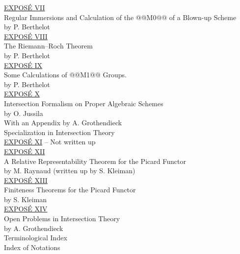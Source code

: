 \underline{EXPOSÉ VII}\\
Regular Immersions and Calculation of the @@M0@@ of a Blown-up Scheme\\
by P. Berthelot \\[8pt]
\underline{EXPOSÉ VIII}\\
The Riemann--Roch Theorem\\
by P. Berthelot \\[8pt]
\underline{EXPOSÉ IX}\\
Some Calculations of @@M1@@ Groups.\\
by P. Berthelot \\[8pt]
\underline{EXPOSÉ X}\\
Intersection Formalism on Proper Algebraic Schemes\\
by O. Jussila\\
With an Appendix by A. Grothendieck\\
Specialization in Intersection Theory \\[8pt]
\underline{EXPOSÉ XI} -- Not written up\\[8pt]
\underline{EXPOSÉ XII}\\
A Relative Representability Theorem for the Picard Functor\\
by M. Raynaud (written up by S. Kleiman) \\[8pt]
\underline{EXPOSÉ XIII}\\
Finiteness Theorems for the Picard Functor\\
by S. Kleiman \\[8pt]
\underline{EXPOSÉ XIV}\\
Open Problems in Intersection Theory\\
by A. Grothendieck \\[8pt]
Terminological Index \\[4pt]
Index of Notations \par

